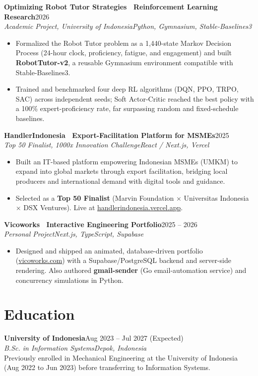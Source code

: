 \documentclass[a4paper,11pt]{article}
\newcommand{\entry}[4]{%
  \vspace{7pt}
  {\bfseries #1}\hfill{\normalsize #2}\\[2pt]
  {\itshape #3}\hfill{\itshape\small #4}\\[1pt]
}
\begin{document}
\entry{Optimizing Robot Tutor Strategies \textbar\ Reinforcement Learning Research}{2026}{Academic Project, University of Indonesia}{Python, Gymnasium, Stable-Baselines3}
\begin{itemize}
  \item Formalized the Robot Tutor problem as a 1{,}440-state Markov Decision Process (24-hour clock, proficiency, fatigue, and engagement) and built \textbf{RobotTutor-v2}, a reusable Gymnasium environment compatible with Stable-Baselines3.
  \item Trained and benchmarked four deep RL algorithms (DQN, PPO, TRPO, SAC) across independent seeds; Soft Actor-Critic reached the best policy with a 100\% expert-proficiency rate, far surpassing random and fixed-schedule baselines.
\end{itemize}

\entry{HandlerIndonesia \textbar\ Export-Facilitation Platform for MSMEs}{2025}{Top 50 Finalist, 1000x Innovation Challenge}{React / Next.js, Vercel}
\begin{itemize}
  \item Built an IT-based platform empowering Indonesian MSMEs (UMKM) to expand into global markets through export facilitation, bridging local producers and international demand with digital tools and guidance.
  \item Selected as a \textbf{Top 50 Finalist} (Marvin Foundation $\times$ Universitas Indonesia $\times$ DSX Ventures). Live at \href{https://handlerindonesia.vercel.app}{handlerindonesia.vercel.app}.
\end{itemize}

\entry{Vicoworks \textbar\ Interactive Engineering Portfolio}{2025 -- 2026}{Personal Project}{Next.js, TypeScript, Supabase}
\begin{itemize}
  \item Designed and shipped an animated, database-driven portfolio (\href{https://vicoworks.com}{vicoworks.com}) with a Supabase/PostgreSQL backend and server-side rendering. Also authored \textbf{gmail-sender} (Go email-automation service) and concurrency simulations in Python.
\end{itemize}

\section{Education}
\entry{University of Indonesia}{Aug 2023 -- Jul 2027 (Expected)}{B.Sc. in Information Systems}{Depok, Indonesia}
\vspace{3pt}
Previously enrolled in Mechanical Engineering at the University of Indonesia (Aug 2022 to Jun 2023) before transferring to Information Systems.
\end{document}
